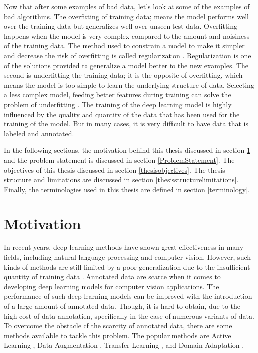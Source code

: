 Now that after some examples of bad data, let's look at some of the examples of bad algorithms. The overfitting of training data; means the model performs well over the training data but generalizes well over unseen test data. Overfitting happens when the model is very complex compared to the amount and noisiness of the training data.  The method used to constrain a model to make it simpler and decrease the risk of overfitting is called regularization \cite{kukacka2017regularization}. Regularization is one of the solutions provided to generalize a model better to the new examples. The second is underfitting the training data; it is the opposite of overfitting, which means the model is too simple to learn the underlying structure of data. Selecting a less complex model, feeding better features during training can solve the problem of underfitting \cite{10.5555/3153997}. The training of the deep learning model is highly influenced by the quality and quantity of the data that has been used for the training of the model. But in many cases, it is very difficult to have data that is labeled and annotated. 


In the following sections, the motivation behind this thesis discussed in section \ref{motivation} and the problem statement is discussed in section \ref{ProblemStatement}. The objectives of this thesis discussed in section \ref{thesisobjectives}. The thesis structure and limitations are discussed in section \ref{thesisstructurelimitations}. Finally, the terminologies used in this thesis are defined in section \ref{terminology}.



\section{Motivation}\label{motivation}

In recent years, deep learning methods have shown great effectiveness in many fields, including natural language processing and computer vision. However, such kinds of methods are still limited by a poor generalization due to the insufficient quantity of training data \cite{8978087}. Annotated data are scarce when it comes to developing deep learning models for computer vision applications. The performance of such deep learning models can be improved with the introduction of a large amount of annotated data. Though, it is hard to obtain, due to the high cost of data annotation, specifically in the case of numerous variants of data. To overcome the obstacle of the scarcity of annotated data, there are some methods available to tackle this problem. The popular methods are Active Learning \cite{hemmer2020deal}, Data Augmentation \cite{Shorten.2019}, Transfer Learning \cite{zhuang2020comprehensive}, and Domain Adaptation \cite{redko2020survey}. 

